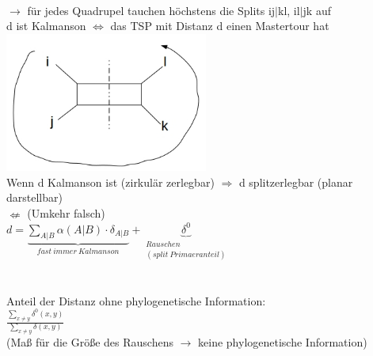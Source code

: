 \\
$\rightarrow$ für jedes Quadrupel tauchen höchstens die Splits ij$|$kl, il$|$jk auf\\
d ist Kalmanson $\Leftrightarrow$ das TSP mit Distanz d einen Mastertour hat\\
\includegraphics[width=0.5\textwidth]{lectures/161216/pix/7.jpg}\\
Wenn d Kalmanson ist (zirkulär zerlegbar) $\Rightarrow$ d splitzerlegbar (planar darstellbar)\\
$\nLeftarrow$ (Umkehr falsch)\\

$d=\underbrace{\displaystyle\sum_{A|B}\alpha(A|B) \cdot \delta_{A|B}}_{fast\ immer\ Kalmanson} + \underbrace{\delta^0}_{\substack{Rauschen \\ (split\ Primaeranteil)}}$\\\\\\
Anteil der Distanz ohne phylogenetische Information:\\
$\frac{\displaystyle\sum_{x\neq y} \delta^0(x,y)}{\displaystyle\sum_{x\neq y} \delta(x,y)}$\\
(Maß für die Größe des Rauschens $\rightarrow$ keine phylogenetische Information)
